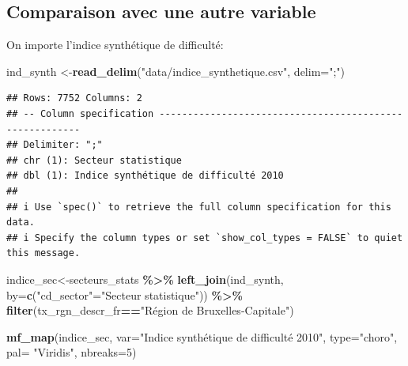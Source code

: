 \documentclass[
]{book}
\newenvironment{Shaded}{\begin{snugshade}}{\end{snugshade}}
\newcommand{\AttributeTok}[1]{\textcolor[rgb]{0.13,0.29,0.53}{#1}}
\newcommand{\DecValTok}[1]{\textcolor[rgb]{0.00,0.00,0.81}{#1}}
\newcommand{\FunctionTok}[1]{\textcolor[rgb]{0.13,0.29,0.53}{\textbf{#1}}}
\newcommand{\NormalTok}[1]{#1}
\newcommand{\OtherTok}[1]{\textcolor[rgb]{0.56,0.35,0.01}{#1}}
\newcommand{\SpecialCharTok}[1]{\textcolor[rgb]{0.81,0.36,0.00}{\textbf{#1}}}
\newcommand{\StringTok}[1]{\textcolor[rgb]{0.31,0.60,0.02}{#1}}
\begin{document}
\hypertarget{comparaison-avec-une-autre-variable}{%
\subsection{Comparaison avec une autre variable}\label{comparaison-avec-une-autre-variable}}

On importe l'indice synthétique de difficulté:

\begin{Shaded}
\begin{Highlighting}[]
\NormalTok{ind\_synth }\OtherTok{\textless{}{-}}\FunctionTok{read\_delim}\NormalTok{(}\StringTok{"data/indice\_synthetique.csv"}\NormalTok{, }\AttributeTok{delim=}\StringTok{";"}\NormalTok{)}
\end{Highlighting}
\end{Shaded}

\begin{verbatim}
## Rows: 7752 Columns: 2
## -- Column specification --------------------------------------------------------
## Delimiter: ";"
## chr (1): Secteur statistique
## dbl (1): Indice synthétique de difficulté 2010
## 
## i Use `spec()` to retrieve the full column specification for this data.
## i Specify the column types or set `show_col_types = FALSE` to quiet this message.
\end{verbatim}

\begin{Shaded}
\begin{Highlighting}[]
\NormalTok{indice\_sec}\OtherTok{\textless{}{-}}\NormalTok{secteurs\_stats }\SpecialCharTok{\%\textgreater{}\%}
  \FunctionTok{left\_join}\NormalTok{(ind\_synth, }\AttributeTok{by=}\FunctionTok{c}\NormalTok{(}\StringTok{"cd\_sector"}\OtherTok{=}\StringTok{"Secteur statistique"}\NormalTok{)) }\SpecialCharTok{\%\textgreater{}\%} 
  \FunctionTok{filter}\NormalTok{(tx\_rgn\_descr\_fr}\SpecialCharTok{==}\StringTok{"Région de Bruxelles{-}Capitale"}\NormalTok{)}

\FunctionTok{mf\_map}\NormalTok{(indice\_sec, }
       \AttributeTok{var=}\StringTok{"Indice synthétique de difficulté 2010"}\NormalTok{, }
       \AttributeTok{type=}\StringTok{"choro"}\NormalTok{, }
       \AttributeTok{pal=} \StringTok{"Viridis"}\NormalTok{, }
       \AttributeTok{nbreaks=}\DecValTok{5}\NormalTok{)}
\end{Highlighting}
\end{Shaded}
\end{document}
